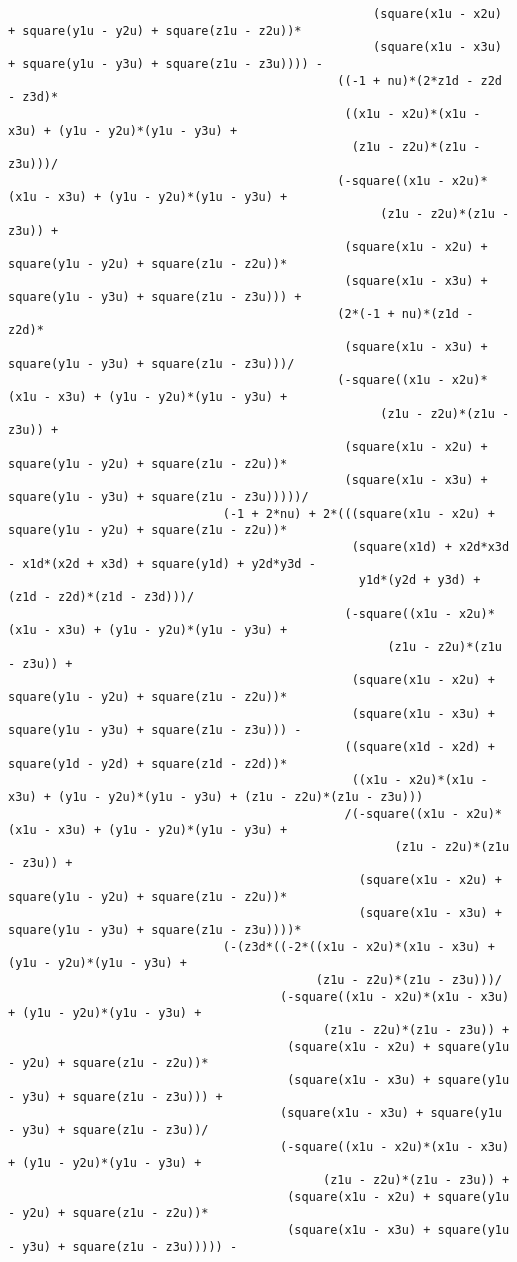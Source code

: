 \begin{lstlisting}
												   (square(x1u - x2u) + square(y1u - y2u) + square(z1u - z2u))*
												   (square(x1u - x3u) + square(y1u - y3u) + square(z1u - z3u)))) - 
											  ((-1 + nu)*(2*z1d - z2d - z3d)*
											   ((x1u - x2u)*(x1u - x3u) + (y1u - y2u)*(y1u - y3u) + 
												(z1u - z2u)*(z1u - z3u)))/
											  (-square((x1u - x2u)*(x1u - x3u) + (y1u - y2u)*(y1u - y3u) + 
													(z1u - z2u)*(z1u - z3u)) + 
											   (square(x1u - x2u) + square(y1u - y2u) + square(z1u - z2u))*
											   (square(x1u - x3u) + square(y1u - y3u) + square(z1u - z3u))) + 
											  (2*(-1 + nu)*(z1d - z2d)*
											   (square(x1u - x3u) + square(y1u - y3u) + square(z1u - z3u)))/
											  (-square((x1u - x2u)*(x1u - x3u) + (y1u - y2u)*(y1u - y3u) + 
													(z1u - z2u)*(z1u - z3u)) + 
											   (square(x1u - x2u) + square(y1u - y2u) + square(z1u - z2u))*
											   (square(x1u - x3u) + square(y1u - y3u) + square(z1u - z3u)))))/
							  (-1 + 2*nu) + 2*(((square(x1u - x2u) + square(y1u - y2u) + square(z1u - z2u))*
												(square(x1d) + x2d*x3d - x1d*(x2d + x3d) + square(y1d) + y2d*y3d - 
												 y1d*(y2d + y3d) + (z1d - z2d)*(z1d - z3d)))/
											   (-square((x1u - x2u)*(x1u - x3u) + (y1u - y2u)*(y1u - y3u) + 
													 (z1u - z2u)*(z1u - z3u)) + 
												(square(x1u - x2u) + square(y1u - y2u) + square(z1u - z2u))*
												(square(x1u - x3u) + square(y1u - y3u) + square(z1u - z3u))) - 
											   ((square(x1d - x2d) + square(y1d - y2d) + square(z1d - z2d))*
												((x1u - x2u)*(x1u - x3u) + (y1u - y2u)*(y1u - y3u) + (z1u - z2u)*(z1u - z3u)))
											   /(-square((x1u - x2u)*(x1u - x3u) + (y1u - y2u)*(y1u - y3u) + 
													  (z1u - z2u)*(z1u - z3u)) + 
												 (square(x1u - x2u) + square(y1u - y2u) + square(z1u - z2u))*
												 (square(x1u - x3u) + square(y1u - y3u) + square(z1u - z3u))))*
							  (-(z3d*((-2*((x1u - x2u)*(x1u - x3u) + (y1u - y2u)*(y1u - y3u) + 
										   (z1u - z2u)*(z1u - z3u)))/
									  (-square((x1u - x2u)*(x1u - x3u) + (y1u - y2u)*(y1u - y3u) + 
											(z1u - z2u)*(z1u - z3u)) + 
									   (square(x1u - x2u) + square(y1u - y2u) + square(z1u - z2u))*
									   (square(x1u - x3u) + square(y1u - y3u) + square(z1u - z3u))) + 
									  (square(x1u - x3u) + square(y1u - y3u) + square(z1u - z3u))/
									  (-square((x1u - x2u)*(x1u - x3u) + (y1u - y2u)*(y1u - y3u) + 
											(z1u - z2u)*(z1u - z3u)) + 
									   (square(x1u - x2u) + square(y1u - y2u) + square(z1u - z2u))*
									   (square(x1u - x3u) + square(y1u - y3u) + square(z1u - z3u))))) - 

\end{lstlisting}
